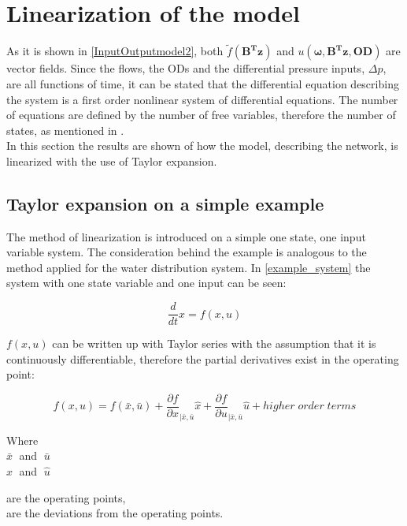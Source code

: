 \section{Linearization of the model} 
\label{Linearization}

As it is shown in \eqref{InputOutputmodel2}, both $\tilde f(\bm{B^T}\bm{z})$ and $u(\bm{\omega},\bm{B^T}\bm{z},\bm{OD})$ are vector fields. Since the flows, the ODs and the differential pressure inputs, $\Delta p$, are all functions of time, it can be stated that the differential equation describing the system is a first order nonlinear system of differential equations. The number of equations are defined by the number of free variables, therefore the number of states, as mentioned in .
\\
In this section the results are shown of how the model, describing the network, is linearized with the use of Taylor expansion.

\subsection{Taylor expansion on a simple example}
 \label{Taylorexamplesection}

The method of linearization is introduced on a simple one state, one input variable system. The consideration behind the example is analogous to the method applied for the water distribution system. In \eqref{example_system} the system with one state variable and one input can be seen: 

\begin{equation}
\frac{d}{dt} x = f(x,u)
 \label{example_system}
\end{equation}

$f(x,u)$ can be written up with Taylor series with the assumption that it is continuously differentiable, therefore the partial derivatives exist in the operating point: 

\begin{equation}
f(x,u) = f(\bar{x},\bar{u}) + \frac{\partial f}{\partial x}_{|\bar{x}, \bar{u}} \hat{x} + \frac{\partial f}{\partial u}_{|\bar{x}, \bar{u}} \hat{u} + higher \; order \; terms  
 \label{TaylorExpansion}
\end{equation}

\begin{minipage}[t]{0.20\textwidth}
Where\\
\hspace*{8mm} $\bar{x} \;$ and $\; \bar{u}$ \\
\hspace*{8mm} $\hat{x} \;$ and $\; \hat{u}$ 
\end{minipage}
\begin{minipage}[t]{0.68\textwidth}
\vspace*{2mm}
are the operating points,\\
are the deviations from the operating points.
\end{minipage}

